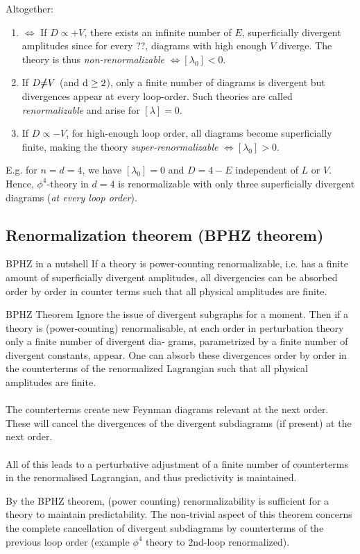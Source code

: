 Altogether:
\begin{enumerate}
	\item $\Leftrightarrow$ If $D\propto + V$, there exists an infinite number of $E$, superficially divergent amplitudes since for every ??, diagrams with high enough $V$ diverge. The theory is thus \emph{non-renormalizable} $\Leftrightarrow [\lambda_0] <0$.
	\item If $D\slashed{\neq} V$ (and $\mathrm{d} \geq 2$), only a finite number of diagrams is divergent but divergences appear at every loop-order. Such theories are called \emph{renormalizable} and arise for $[\lambda]=0$.
	\item If $D \propto -V$, for high-enough loop order, all diagrams become superficially finite, making the theory \emph{super-renormalizable} $\Leftrightarrow [\lambda_0] >0$.
\end{enumerate}
E.g. for $n=d=4$, we have $[\lambda_0 ] =0$ and $D=4-E$ independent of $L$ or $V$. Hence, $\phi^4$-theory in $d=4$ is renormalizable with only three superficially divergent diagrams (\emph{at every loop order}).

\subsection{Renormalization theorem (BPHZ theorem)}
\begin{mybox}{BPHZ in a nutshell}
	If a theory is power-counting renormalizable, i.e. has a finite amount of superficially divergent amplitudes, all divergencies can be absorbed order by order in counter terms such that all physical amplitudes are finite.
\end{mybox}
\begin{mybox}{BPHZ Theorem}
	Ignore the issue of divergent subgraphs for a moment. Then if a theory is (power-counting)
	renormalisable, at each order in perturbation theory only a finite number of divergent dia-
	grams, parametrized by a finite number of divergent constants, appear. One can absorb these
	divergences order by order in the counterterms of the renormalized Lagrangian such that all
	physical amplitudes are finite.\\
	\\
	The counterterms create new Feynman diagrams relevant at the next order. These will cancel
	the divergences of the divergent subdiagrams (if present) at the next order.\\
	\\
	All of this leads to a perturbative adjustment of a finite number of counterterms in the renormalised Lagrangian, and thus predictivity is maintained.
\end{mybox}
By the BPHZ theorem, (power counting) renormalizability is sufficient for a theory to maintain predictability. The non-trivial aspect of this theorem concerns the complete cancellation of divergent subdiagrams by counterterms of the previous loop order (example $\phi^4$ theory to $2$nd-loop renormalized).

